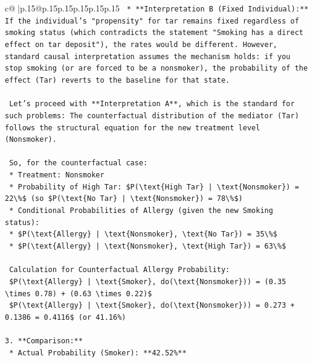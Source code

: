 \documentclass{article}
\begin{document}
{\begin{supertabular}{c@{$\;$}|p{.15\linewidth}@{}p{.15\linewidth}p{.15\linewidth}p{.15\linewidth}p{.15\linewidth}p{.15\linewidth}}
{{{\texttt{    *   **Interpretation B (Fixed Individual):** If the individual's "propensity" for tar remains fixed regardless of smoking status (which contradicts the statement "Smoking has a direct effect on tar deposit"), the rates would be different. However, standard causal interpretation assumes the mechanism holds: if you stop smoking (or are forced to be a nonsmoker), the probability of the effect (Tar) reverts to the baseline for that state.} \\
\\ 
\texttt{    Let's proceed with **Interpretation A**, which is the standard for such problems: The counterfactual distribution of the mediator (Tar) follows the structural equation for the new treatment level (Nonsmoker).} \\
\\ 
\texttt{    So, for the counterfactual case:} \\
\texttt{    *   Treatment: Nonsmoker} \\
\texttt{    *   Probability of High Tar: \$P(\textbackslash{}text\{High Tar\} | \textbackslash{}text\{Nonsmoker\}) = 22\textbackslash{}\%\$ (so \$P(\textbackslash{}text\{No Tar\} | \textbackslash{}text\{Nonsmoker\}) = 78\textbackslash{}\%\$)} \\
\texttt{    *   Conditional Probabilities of Allergy (given the new Smoking status):} \\
\texttt{        *   \$P(\textbackslash{}text\{Allergy\} | \textbackslash{}text\{Nonsmoker\}, \textbackslash{}text\{No Tar\}) = 35\textbackslash{}\%\$} \\
\texttt{        *   \$P(\textbackslash{}text\{Allergy\} | \textbackslash{}text\{Nonsmoker\}, \textbackslash{}text\{High Tar\}) = 63\textbackslash{}\%\$} \\
\\ 
\texttt{    Calculation for Counterfactual Allergy Probability:} \\
\texttt{    \$P(\textbackslash{}text\{Allergy\} | \textbackslash{}text\{Smoker\}, do(\textbackslash{}text\{Nonsmoker\})) = (0.35 \textbackslash{}times 0.78) + (0.63 \textbackslash{}times 0.22)\$} \\
\texttt{    \$P(\textbackslash{}text\{Allergy\} | \textbackslash{}text\{Smoker\}, do(\textbackslash{}text\{Nonsmoker\})) = 0.273 + 0.1386 = 0.4116\$ (or 41.16\%)} \\
\\ 
\texttt{3.  **Comparison:**} \\
\texttt{    *   Actual Probability (Smoker): **42.52\%**} \\
}}}
\end{supertabular}}
\end{document}
